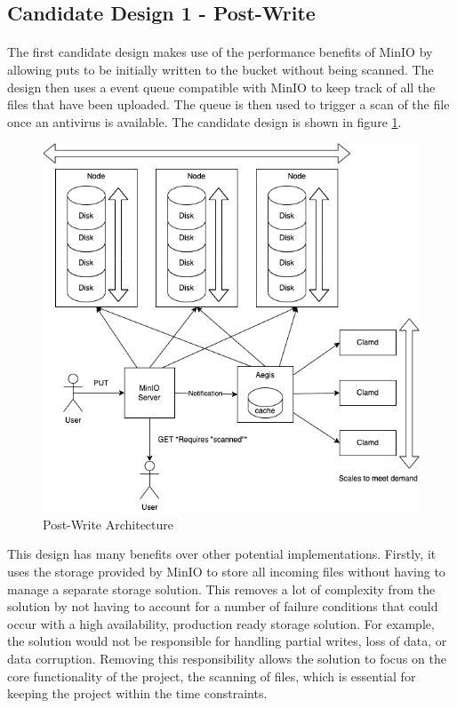 \documentclass[12pt, conference, final, a4paper, onecolumn, compsoc]{IEEEtran}
\begin{document}
\subsection*{Candidate Design 1 - Post-Write}
\paragraph{}

The first candidate design makes use of the performance benefits of MinIO by
allowing puts to be initially written to the bucket without being scanned. The
design then uses a event queue compatible with MinIO to keep track of all the
files that have been uploaded. The queue is then used to trigger a scan of the
file once an antivirus is available. The candidate design is shown in figure
\ref{fig:postWriteArch}.

\begin{figure}
  \includegraphics[scale=.4]{diagrams/post-write.png}
  \caption{Post-Write Architecture}
  \label{fig:postWriteArch}
\end{figure}

This design has many benefits over other potential implementations. Firstly, it
uses the storage provided by MinIO to store all incoming files without having to
manage a separate storage solution. This removes a lot of complexity from the
solution by not having to account for a number of failure conditions that could
occur with a high availability, production ready storage solution. For example,
the solution would not be responsible for handling partial writes, loss of data,
or data corruption. Removing this responsibility allows the solution to focus on
the core functionality of the project, the scanning of files, which is essential
for keeping the project within the time constraints.
\end{document}
